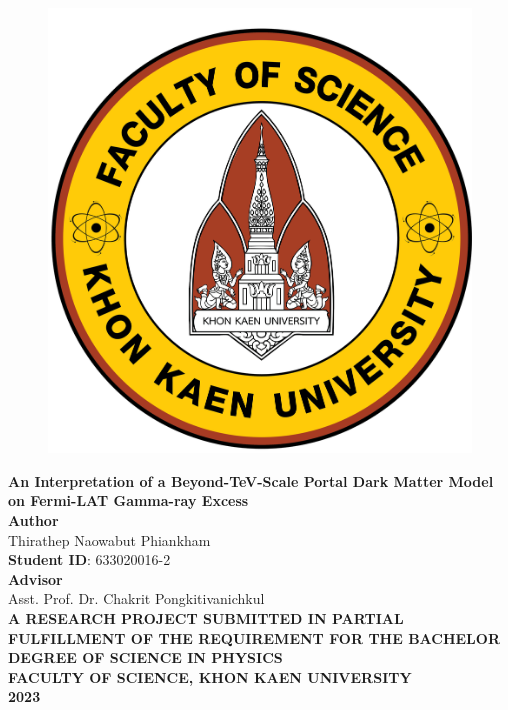 \documentclass[10pt, oneside]{book}
\date{}
\numberwithin{equation}{chapter}
\begin{document}

\begin{figure}
	\centering
	\includegraphics[scale=0.06]{logo_eng.png}
\end{figure}
\begin{center}
	\large
    \textbf{An Interpretation of a Beyond-TeV-Scale Portal Dark Matter Model on Fermi-LAT Gamma-ray Excess} \\
	\vspace{3cm}
	\textbf{Author} \\
	Thirathep Naowabut Phiankham \\
	\textbf{Student ID}: 633020016-2 \\
	\vspace{3cm}
	\textbf{Advisor} \\
	Asst. Prof. Dr. Chakrit Pongkitivanichkul \\
	\vspace{3cm}
	\textbf{A RESEARCH PROJECT SUBMITTED IN PARTIAL FULFILLMENT OF THE  REQUIREMENT FOR THE BACHELOR DEGREE OF SCIENCE IN PHYSICS \\
		FACULTY OF SCIENCE, KHON KAEN UNIVERSITY \\
		\vspace{1cm}
		2023}
\end{center}
\thispagestyle{empty}
\newpage
\end{document}
